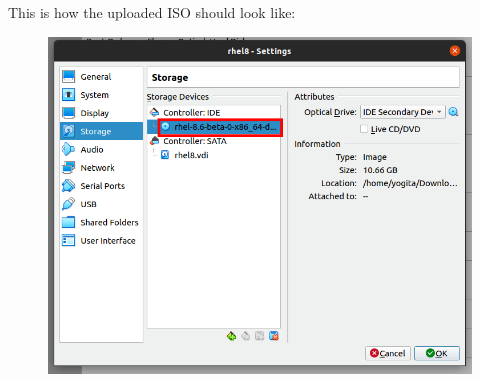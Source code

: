 \begin{flushleft}
\begin{itemize}
	\newpage
	This is how the uploaded ISO should look like:
	\begin{figure}[h!]
		\centering
		\includegraphics[scale=.3]{content/chapter18/images/image10.png}
	\end{figure}		
	
\end{itemize} 
 
\end{flushleft}
\newpage


